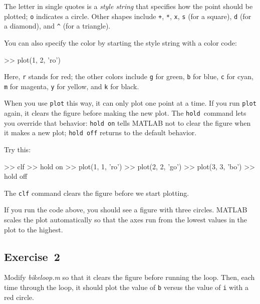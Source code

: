 
The letter in single quotes is a \emph{style string} that specifies how the
point should be plotted;  \lstinline{o} indicates a circle.
Other shapes include \lstinline{+},
\lstinline{*},
\lstinline{x},
\lstinline{s} (for a square),
\lstinline{d} (for a diamond), and
\lstinline{^} (for a triangle).

You can also specify the color by starting the style string with a color code:

\begin{code}
>> plot(1, 2, 'ro')
\end{code}

Here, \lstinline{r} stands for red; the other colors include \lstinline{g} for green, \lstinline{b} for blue, \lstinline{c} for cyan, \lstinline{m} for magenta, \lstinline{y} for yellow, and \lstinline{k} for black.

When you use \lstinline{plot} this way, it can only plot one point at a
time.  If you run \lstinline{plot} again, it clears the figure before making
the new plot.  The \lstinline{hold}~command lets you override that behavior:
\lstinline{hold on} tells MATLAB not to clear the figure when it makes a new
plot; \lstinline{hold off} returns to the default behavior.


Try this:

\begin{code}
>> clf
>> hold on
>> plot(1, 1, 'ro')
>> plot(2, 2, 'go')
>> plot(3, 3, 'bo')
>> hold off
\end{code}

The \lstinline{clf} command clears the figure before we start plotting.


If you run the code above, you should see a figure with three circles.  MATLAB scales the plot automatically so that the axes run from the lowest values in the plot to the highest.

\subsection{Exercise~2}
Modify \emph{bike\textunderscore loop.m} so that it clears the figure before running the loop.  Then, each time through the loop, it should plot the value of \lstinline{b} versus the value of \lstinline{i} with a red circle.

